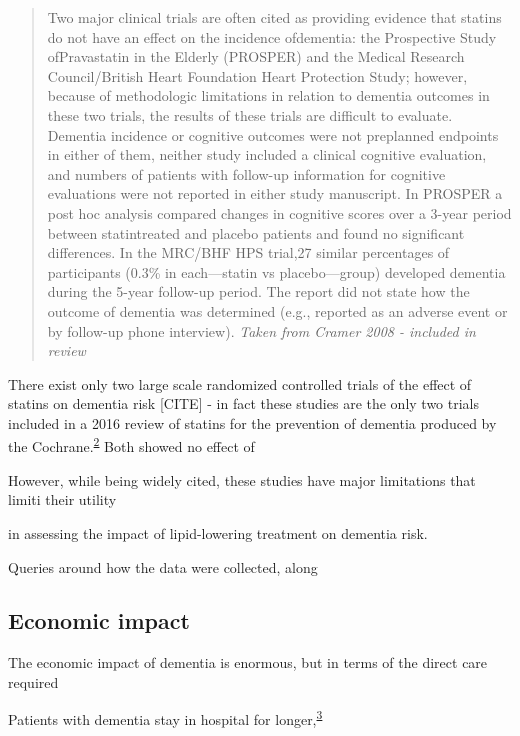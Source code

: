 \documentclass[a4paper, twoside]{templates/ociamthesis}
\begin{document}
\begin{quote}
Two major clinical trials are often cited as providing evidence that statins do not have an effect on the incidence ofdementia: the Prospective Study ofPravastatin in the Elderly (PROSPER) and the Medical Research Council/British Heart Foundation Heart Protection Study; however, because of methodologic limitations in relation to dementia outcomes in these two trials, the results of these trials are difficult to evaluate. Dementia incidence or cognitive outcomes were not preplanned endpoints in either of them, neither study included a clinical cognitive evaluation, and numbers of patients with follow-up information for cognitive evaluations were not reported in either study manuscript. In PROSPER a post hoc analysis compared changes in cognitive scores over a 3-year period between statintreated and placebo patients and found no significant differences. In the MRC/BHF HPS trial,27 similar percentages of participants (0.3\% in each---statin vs placebo---group) developed dementia during the 5-year follow-up period. The report did not state how the outcome of dementia was determined (e.g., reported as an adverse event or by follow-up phone interview). \emph{Taken from Cramer 2008 - included in review}
\end{quote}

There exist only two large scale randomized controlled trials of the effect of statins on dementia risk {[}CITE{]} - in fact these studies are the only two trials included in a 2016 review of statins for the prevention of dementia produced by the Cochrane.\textsuperscript{\protect\hyperlink{ref-mcguinness2016b}{2}} Both showed no effect of

However, while being widely cited, these studies have major limitations that limiti their utility

in assessing the impact of lipid-lowering treatment on dementia risk.

Queries around how the data were collected, along

\hypertarget{economic-impact}{%
\subsection{Economic impact}\label{economic-impact}}

The economic impact of dementia is enormous, but in terms of the direct care required

Patients with dementia stay in hospital for longer,\textsuperscript{\protect\hyperlink{ref-mollers2019}{3}}
\end{document}
